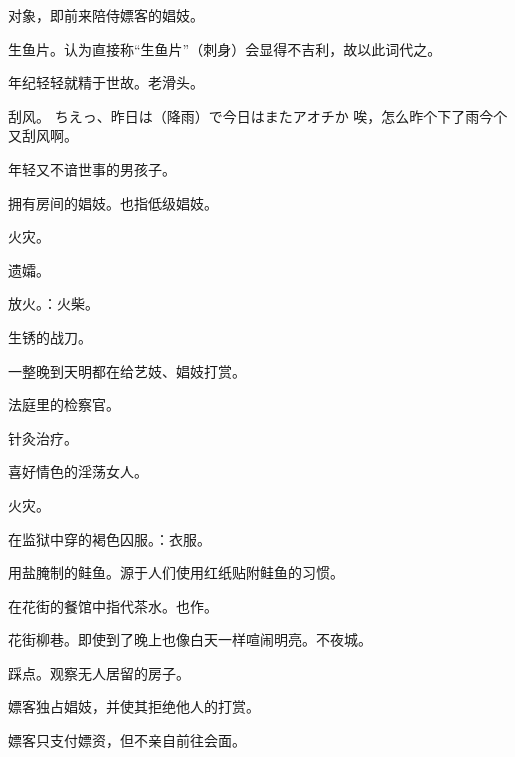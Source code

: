 

{对象，即前来陪侍嫖客的娼妓。}

{生鱼片。认为直接称“生鱼片”（刺身）会显得不吉利，故以此词代之。}

{年纪轻轻就精于世故。老滑头。} %

{刮风。
  \itemquote
  {ちえっ、昨日は（降雨）で今日はまたアオチか}
{唉，怎么昨个下了雨今个又刮风啊。}}

{年轻又不谙世事的男孩子。}

{拥有房间的娼妓。也指低级娼妓。}

{火灾。}

{遗孀。}

{放火。：火柴。}

{生锈的战刀。}

{一整晚到天明都在给艺妓、娼妓打赏。}

{法庭里的检察官。}

{针灸治疗。}

{喜好情色的淫荡女人。}

{火灾。}

{在监狱中穿的褐色囚服。：衣服。}

{用盐腌制的鲑鱼。源于人们使用红纸贴附鲑鱼的习惯。}

{在花街的餐馆中指代茶水。也作。}

{花街柳巷。即使到了晚上也像白天一样喧闹明亮。不夜城。}

{踩点。观察无人居留的房子。}

{嫖客独占娼妓，并使其拒绝他人的打赏。}

{嫖客只支付嫖资，但不亲自前往会面。}

